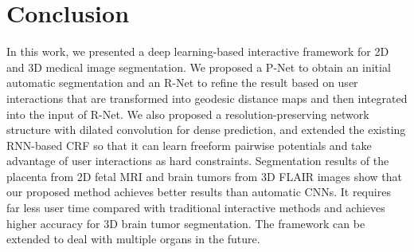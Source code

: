\documentclass[10pt,journal,compsoc]{IEEEtran}
\begin{document}
\section{Conclusion}
In this work, we presented a deep learning-based interactive framework for 2D and 3D medical image segmentation. We proposed a P-Net to obtain an initial automatic segmentation and an R-Net to refine the result based on user interactions that are transformed into geodesic distance maps and then integrated into the input of R-Net. We also proposed a resolution-preserving network structure with dilated convolution for dense prediction, and extended the existing RNN-based CRF so that it can learn freeform pairwise potentials and take advantage of user interactions as hard constraints. Segmentation results of the placenta from 2D fetal MRI and brain tumors from 3D FLAIR images show that our proposed method achieves better results than automatic CNNs. It requires far less user time compared with traditional interactive methods and achieves higher accuracy for 3D brain tumor segmentation. The framework can be extended to deal with multiple organs in the future.




%


\end{document}
